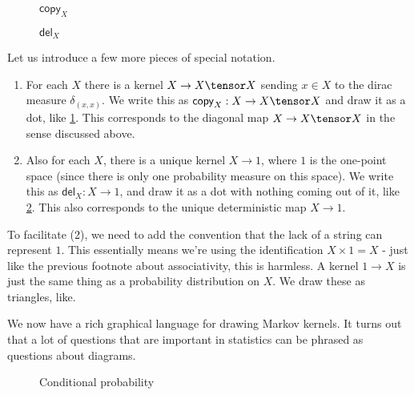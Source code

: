 \documentclass{article}
\newcommand{\del}{\mathsf{del}}
\newcommand{\cop}{\mathsf{copy}}
\begin{document}
\begin{figure}
\begin{center}

\end{center}
\caption{$\cop_X$}
\label{fig:copy}
\end{figure}

\begin{figure}
\begin{center}

\end{center}
\caption{$\del_X$}
\label{fig:delete}
\end{figure}

Let us introduce a few more pieces of special notation.

\begin{enumerate}
    \item For each $X$ there is a kernel $X \to X \tensor X$ sending $x \in X$ to the dirac measure $\delta_{(x,x)}$.
    We write this as $\mathsf{copy}_X: X \to X \tensor X$ and draw it as a dot, like \cref{fig:copy}. This corresponds to the diagonal map $X \to X \tensor X$ in the sense discussed above.
    \item Also for each $X$, there is a unique kernel $X \to 1$, where $1$ is the one-point space (since there is only one probability measure on this space).
    We write this as $\mathsf{del}_X: X \to 1$, and draw it as a dot with nothing coming out of it, like \cref{fig:delete}. This also corresponds to the unique deterministic map $X \to 1$.
\end{enumerate}

To facilitate (2), we need to add the convention that the lack of a string can represent $1$.
This essentially means we're using the identification $X \times 1 = X$ - just like the previous footnote about associativity, this is harmless.
A kernel $1 \to X$ is just the same thing as a probability distribution on $X$. We draw these as triangles, like.

We now have a rich graphical language for drawing Markov kernels.
It turns out that a lot of questions that are important in statistics can be phrased as questions about diagrams.
\begin{figure}
    \begin{center}
    
    \end{center}
    \caption{Conditional probability}
    
    \label{fig:conditional}
\end{figure}   
\end{document}
